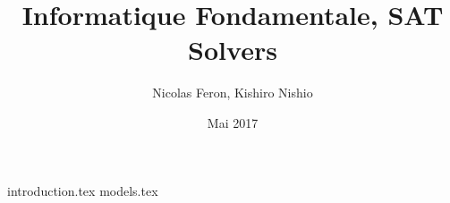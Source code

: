 \documentclass{article}
\title{Informatique Fondamentale, SAT Solvers}
\author{Nicolas Feron,  Kishiro Nishio }
\date{Mai 2017}
\begin{document}
\maketitle

 {introduction.tex}
\newpage
 {models.tex}
\newpage

\end{document}
